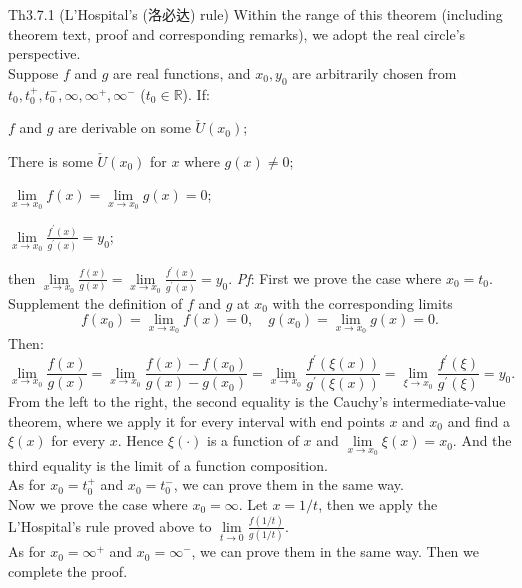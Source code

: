 \documentclass{article}
\begin{document}
\begin{Th}{Th3.7.1 (L'Hospital's (洛必达) rule)}
    Within the range of this theorem (including theorem text, proof and corresponding remarks), we adopt the real circle's perspective.\\
    Suppose $f$ and $g$ are real functions, and $x_0, y_0$ are arbitrarily chosen from $t_0, t_0^+, t_0^-, \infty, \infty^+, \infty^-$ ($t_0\in\mathbb{R}$). If:
    \begin{compactenum}
        \item $f$ and $g$ are derivable on some $\check{U}(x_0)$;
        \item There is some $\check{U}(x_0)$ for $x$ where $g(x)\neq 0$;
        \item $\lim\limits_{x\to x_0} f(x) = \lim\limits_{x\to x_0} g(x) = 0$;
        \item $\lim\limits_{x\to x_0} \frac{f^\prime(x)}{g^\prime(x)} = y_0$;
    \end{compactenum}
    then $\lim\limits_{x\to x_0} \frac{f(x)}{g(x)} = \lim\limits_{x\to x_0} \frac{f^\prime(x)}{g^\prime(x)} = y_0$.
    \tcblower
    \textit{Pf}: First we prove the case where $x_0 = t_0$. Supplement the definition of $f$ and $g$ at $x_0$ with the corresponding limits
    $$ f(x_0) = \lim\limits_{x\to x_0} f(x) = 0, \quad g(x_0) = \lim\limits_{x\to x_0} g(x) = 0. $$
    Then:
    $$ \lim\limits_{x\to x_0} \frac{f(x)}{g(x)} = \lim\limits_{x\to x_0} \frac{f(x)-f(x_0)}{g(x)-g(x_0)} = \lim\limits_{x\to x_0} \frac{f^\prime(\xi(x))}{g^\prime(\xi(x))} = \lim\limits_{\xi\to x_0} \frac{f^\prime(\xi)}{g^\prime(\xi)} = y_0. $$
    From the left to the right, the second equality is the Cauchy's intermediate-value theorem, where we apply it for every interval with end points $x$ and $x_0$ and find a $\xi(x)$ for every $x$. Hence $\xi(\cdot)$ is a function of $x$ and $\lim\limits_{x\to x_0} \xi(x) = x_0$. And the third equality is the limit of a function composition. \\
    As for $x_0=t_0^+$ and $x_0=t_0^-$, we can prove them in the same way.\\
    Now we prove the case where $x_0 = \infty$. Let $x = 1/t$, then we apply the L'Hospital's rule proved above to $\lim\limits_{t\to 0} \frac{f(1/t)}{g(1/t)}$.\\
    As for $x_0 = \infty^+$ and $x_0 = \infty^-$, we can prove them in the same way. Then we complete the proof.
\end{Th}
\end{document}
